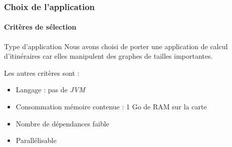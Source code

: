 \begin{frame}
  \frametitle{Choix de l'application}
  \framesubtitle{Critères de sélection}
  \begin{block}{Type d'application}
    Nous avons choisi de porter une application de calcul d'itinéraires car elles
    manipulent des graphes de tailles importantes.
  \end{block}
  Les autres critères sont :
  \begin{itemize}
  \item Langage : pas de \textit{JVM}
    \vspace{1em}
  \item Consommation mémoire contenue : 1 Go de RAM sur la carte
    \vspace{1em}
  \item Nombre de dépendances faible
    \vspace{1em}
  \item Parallélisable
  \end{itemize}
\end{frame}


